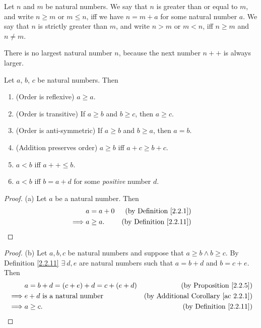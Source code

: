 \begin{definition}\label{2.2.11}
Let \(n\) and \(m\) be natural numbers.
We say that \(n\) is greater than or equal to \(m\), and write \(n \geq m\) or \(m \leq n\), iff we have \(n = m + a\) for some natural number \(a\).
We say that \(n\) is strictly greater than \(m\), and write \(n > m\) or \(m < n\), iff \(n \geq m\) and \(n \neq m\).
\end{definition}

\begin{note}
There is no largest natural number \(n\), because the next number \(n++\) is always larger.
\end{note}

\begin{proposition}\label{2.2.12}
Let \(a\), \(b\), \(c\) be natural numbers.
Then
\begin{enumerate}
\item (Order is reflexive) \(a \geq a\).
\item (Order is transitive) If \(a \geq b\) and \(b \geq c\), then \(a \geq c\).
\item (Order is anti-symmetric) If \(a \geq b\) and \(b \geq a\), then \(a = b\).
\item (Addition preserves order) \(a \geq b\) iff \(a + c \geq b + c\).
\item \(a < b\) iff \(a++ \leq b\).
\item \(a < b\) iff \(b = a + d\) for some \emph{positive} number \(d\).
\end{enumerate}
\end{proposition}

\begin{proof}{(a)}
Let \(a\) be a natural number.
Then
\begin{align*}
& a = a + 0 & \text{(by Definition \ref{2.2.1})} \\
\implies & a \geq a. & \text{(by Definition \ref{2.2.11})}
\end{align*}
\end{proof}

\begin{proof}{(b)}
Let \(a, b, c\) be natural numbers and suppose that \(a \geq b \land b \geq c\).
By Definition \ref{2.2.11} \(\exists\ d, e\) are natural numbers such that \(a = b + d\) and \(b = c + e\).
Then
\begin{align*}
& a = b + d = (c + e) + d = c + (e + d) & \text{(by Proposition \ref{2.2.5})} \\
\implies & e + d \text{ is a natural number} & \text{(by Additional Corollary \ref{ac 2.2.1})} \\
\implies & a \geq c. & \text{(by Definition \ref{2.2.11})} \\
\end{align*}
\end{proof}


